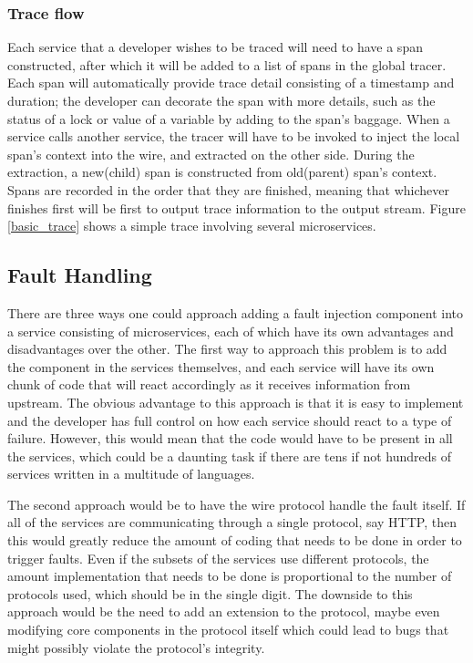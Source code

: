 \documentclass[letterpaper,twocolumn,10pt]{article}
\begin{document}
\subsubsection{Trace flow}
Each service that a developer wishes to be traced will need to have a span constructed, after which it
will be added to a list of spans in the global tracer. Each span will automatically provide trace detail consisting of a timestamp and duration; the developer can decorate the span with more details, such as the status of a lock or value of a variable by adding to the span's baggage. When a service calls another service,
the tracer will have to be invoked to inject the local span's context into the wire, and extracted on the other side. During the extraction, a new(child) span is constructed from old(parent) span's context. Spans are recorded in the order that they are finished, meaning that whichever finishes first will be first to output trace information to the output stream. Figure \ref{basic_trace} shows a simple trace involving several microservices\cite{opentracing:doc}.


\subsection{Fault Handling}
There are three ways one could approach adding a fault injection component into a service consisting of
microservices, each of which have its own advantages and disadvantages over the other. The first way to approach this problem is to add the component in the services themselves, and each service will have its own chunk of code that will react accordingly as it receives information from upstream. The obvious advantage to this approach is that it is easy to implement and the developer has full control on how each service should react to a type of failure. However, this would mean that the code would have to be present in all the services, which could be a daunting task if there are tens if not hundreds of services written in a multitude of languages.

The second approach would be to have the wire protocol handle the fault itself. If all of the services are communicating through a single protocol, say HTTP, then this would greatly reduce the amount of coding that needs to be done in order to trigger faults. Even if the subsets of the services use different protocols, the amount implementation that needs to be done is proportional to the number of protocols used, which should be in the single digit. The downside to this approach would be the need to add an extension to the protocol, maybe even modifying core components in the protocol itself which could lead to bugs that might possibly violate the protocol's integrity.
\end{document}
